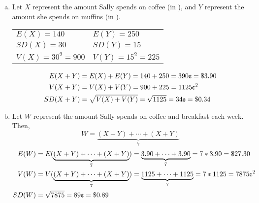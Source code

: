
{
{
\begin{enumerate}[(a)]
\setlength{\itemsep}{0mm}
\item Let $X$ represent the amount Sally spends on coffee (in \textcent), and $Y$ represent the amount she spends on muffins (in \textcent). \\
\begin{center}
\begin{tabular}{l l}
$E(X) = 140$ & $E(Y) = 250$ \\
$SD(X) = 30$ & $SD(Y) = 15$ \\
$V(X) = 30^2 = 900$ & $V(Y) = 15^2 = 225$ \\
\end{tabular}
\end{center}
\begin{align*}
E(X + Y) &= E(X) + E(Y) = 140 + 250 = 390 \text{\textcent} = \$3.90 \\
V(X + Y) &= V(X) + V(Y) = 900 + 225 = 1125 \text{\textcent}^2 \\
SD(X + Y) &= \sqrt{V(X) + V(Y)} =  \sqrt{1125} = 34 \text{\textcent} = \$0.34
\end{align*}
\item Let $W$ represent the amount Sally spends on coffee and breakfast each week. Then,
\[ W = \underbrace{(X+Y) + \cdots + (X+Y)}_{7} \]
\begin{align*}
E(W) &= E(\underbrace{(X+Y) + \cdots + (X+Y)}_{7}) = \underbrace{3.90 + \cdots + 3.90}_{7} = 7 * 3.90 = \$27.30 \\
V(W) &= V(\underbrace{(X+Y) + \cdots + (X+Y)}_{7}) = \underbrace{1125 + \cdots + 1125}_{7} = 7 * 1125 =  7875 \text{\textcent}^2 \\
SD(W) &= \sqrt{7875} = 89 \text{\textcent} = \$0.89
\end{align*} 
\end{enumerate}
}
}

